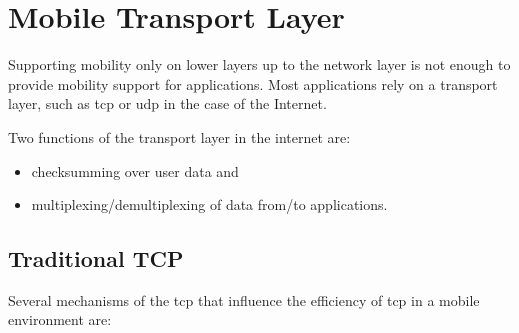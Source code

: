 \chapter{Mobile Transport Layer}

Supporting mobility only on lower layers up to the network layer is not enough to provide mobility support for applications. Most applications rely on a transport layer, such as \gls{tcp} or \gls{udp} in the case of the Internet. 

Two functions of the transport layer in the internet are: 
\begin{itemize}
	\item checksumming over user data and 
	\item multiplexing/demultiplexing of data from/to applications.
\end{itemize}

%


\section{Traditional TCP}
Several mechanisms of the \gls{tcp} that influence the efficiency of \gls{tcp} in a mobile environment are:

